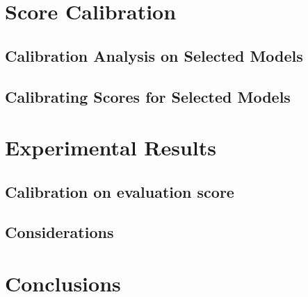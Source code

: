 \documentclass{article}
\begin{document}
\section{Score Calibration}
\subsection{Calibration Analysis on Selected Models}
\subsection{Calibrating Scores for Selected Models}
\section{Experimental Results}
\subsection{Calibration on evaluation score}
\subsection{Considerations}
\section{Conclusions}


\newpage



\end{document}
